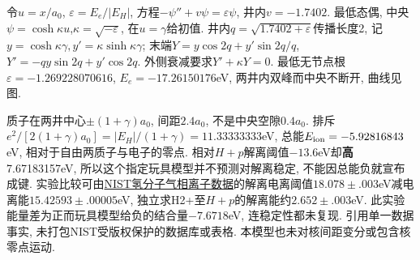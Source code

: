 \begin{solution}
令$u=x/a_0$, $\varepsilon=E_e/|E_H|$, 方程$-\psi''+v\psi=\varepsilon\psi$, 井内$v=-1.7402$. 最低态偶, 中央$\psi=\cosh\kappa u$,$\kappa=\sqrt{-\varepsilon}$, 在$u=\gamma$给初值. 井内$q=\sqrt{1.7402+\varepsilon}$传播长度2, 记$y=\cosh\kappa\gamma,y'=\kappa\sinh\kappa\gamma$; 末端$Y=y\cos2q+y'\sin2q/q$, $Y'=-qy\sin2q+y'\cos2q$. 外侧衰减要求$Y'+\kappa Y=0$. 最低无节点根$\varepsilon=-1.269228070616$, $E_e=-17.26150176$eV, 两井内双峰而中央不断开, 曲线见图.

质子在两井中心$\pm(1+\gamma)a_0$, 间距$2.4a_0$, 不是中央空隙$0.4a_0$. 排斥$e^2/[2(1+\gamma)a_0]=|E_H|/(1+\gamma)=11.33333333$eV, 总能$E_{\rm ion}=-5.92816843$eV, 相对于自由两质子与电子的零点. 相对$H+p$解离阈值$-13.6$eV却\textbf{高}7.67183157eV, 所以这个指定玩具模型并不预测对解离稳定, 不能因总能负就宣布成键. 实验比较可由\href{https://webbook.nist.gov/cgi/cbook.cgi?ID=C1333740\&Units=SI\&Mask=20}{NIST氢分子气相离子数据}的解离电离阈值$18.078\pm.003$eV减电离能$15.42593\pm.00005$eV, 独立求H2+至$H+p$的解离能约$2.652\pm.003$eV. 此实验能量差为正而玩具模型给负的结合量$-7.6718$eV, 连稳定性都未复现. 引用单一数据事实, 未打包NIST受版权保护的数据库或表格. 本模型也未对核间距变分或包含核零点运动.
\end{solution}
